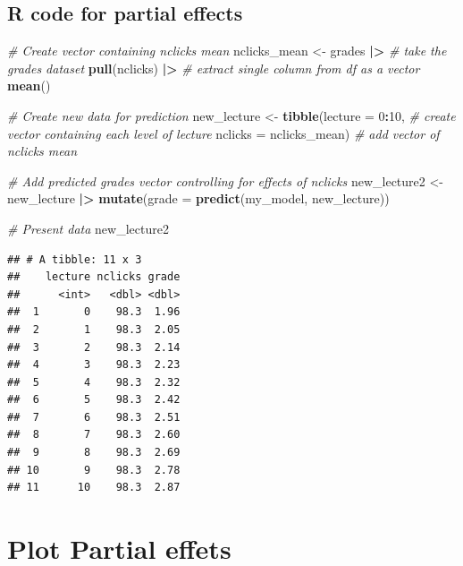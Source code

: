 \documentclass[
]{article}
\newenvironment{Shaded}{\begin{snugshade}}{\end{snugshade}}
\newcommand{\AttributeTok}[1]{\textcolor[rgb]{0.13,0.29,0.53}{#1}}
\newcommand{\CommentTok}[1]{\textcolor[rgb]{0.56,0.35,0.01}{\textit{#1}}}
\newcommand{\DecValTok}[1]{\textcolor[rgb]{0.00,0.00,0.81}{#1}}
\newcommand{\FunctionTok}[1]{\textcolor[rgb]{0.13,0.29,0.53}{\textbf{#1}}}
\newcommand{\NormalTok}[1]{#1}
\newcommand{\OtherTok}[1]{\textcolor[rgb]{0.56,0.35,0.01}{#1}}
\newcommand{\SpecialCharTok}[1]{\textcolor[rgb]{0.81,0.36,0.00}{\textbf{#1}}}
\begin{document}
\hypertarget{r-code-for-partial-effects}{%
\subsection{R code for partial
effects}\label{r-code-for-partial-effects}}

\begin{Shaded}
\begin{Highlighting}[]
\CommentTok{\# Create vector containing nclicks mean}
\NormalTok{nclicks\_mean }\OtherTok{\textless{}{-}} 
\NormalTok{  grades }\SpecialCharTok{|\textgreater{}}         \CommentTok{\# take the grades dataset}
  \FunctionTok{pull}\NormalTok{(nclicks) }\SpecialCharTok{|\textgreater{}}  \CommentTok{\# extract single column from df as a vector}
  \FunctionTok{mean}\NormalTok{()}

\CommentTok{\# Create new data for prediction}
\NormalTok{new\_lecture }\OtherTok{\textless{}{-}} 
  \FunctionTok{tibble}\NormalTok{(}\AttributeTok{lecture =} \DecValTok{0}\SpecialCharTok{:}\DecValTok{10}\NormalTok{,         }\CommentTok{\# create vector containing each level of lecture}
         \AttributeTok{nclicks =}\NormalTok{ nclicks\_mean) }\CommentTok{\# add vector of nclicks mean}

\CommentTok{\# Add predicted grades vector controlling for effects of nclicks}
\NormalTok{new\_lecture2 }\OtherTok{\textless{}{-}} 
\NormalTok{  new\_lecture }\SpecialCharTok{|\textgreater{}}
  \FunctionTok{mutate}\NormalTok{(}\AttributeTok{grade =} \FunctionTok{predict}\NormalTok{(my\_model, new\_lecture))  }

\CommentTok{\# Present data}
\NormalTok{new\_lecture2}
\end{Highlighting}
\end{Shaded}

\begin{verbatim}
## # A tibble: 11 x 3
##    lecture nclicks grade
##      <int>   <dbl> <dbl>
##  1       0    98.3  1.96
##  2       1    98.3  2.05
##  3       2    98.3  2.14
##  4       3    98.3  2.23
##  5       4    98.3  2.32
##  6       5    98.3  2.42
##  7       6    98.3  2.51
##  8       7    98.3  2.60
##  9       8    98.3  2.69
## 10       9    98.3  2.78
## 11      10    98.3  2.87
\end{verbatim}

\hypertarget{plot-partial-effets}{%
\section{Plot Partial effets}\label{plot-partial-effets}}
\end{document}
